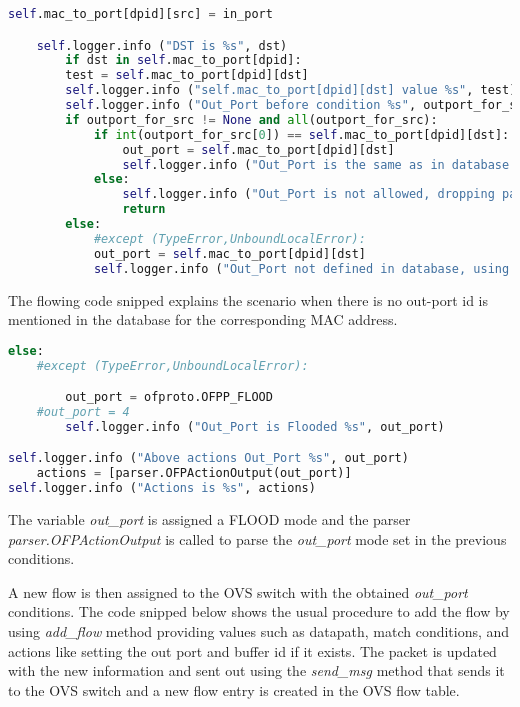 \begin{lstlisting}[language=Python]
	    self.mac_to_port[dpid][src] = in_port

	self.logger.info ("DST is %s", dst)
		if dst in self.mac_to_port[dpid]:
		test = self.mac_to_port[dpid][dst]
		self.logger.info ("self.mac_to_port[dpid][dst] value %s", test)
		self.logger.info ("Out_Port before condition %s", outport_for_src)
		if outport_for_src != None and all(outport_for_src):
			if int(outport_for_src[0]) == self.mac_to_port[dpid][dst]:
				out_port = self.mac_to_port[dpid][dst]
				self.logger.info ("Out_Port is the same as in database table %s", out_port)
			else:
				self.logger.info ("Out_Port is not allowed, dropping packet")	
				return	
		else:
			#except (TypeError,UnboundLocalError):		
			out_port = self.mac_to_port[dpid][dst]		
			self.logger.info ("Out_Port not defined in database, using learned port")	
\end{lstlisting}

The flowing code snipped explains the scenario when there is no out-port id is mentioned in the database for the corresponding MAC address. 

\begin{lstlisting}[language=Python]
	else:
	#except (TypeError,UnboundLocalError):

		out_port = ofproto.OFPP_FLOOD
	#out_port = 4
		self.logger.info ("Out_Port is Flooded %s", out_port)

self.logger.info ("Above actions Out_Port %s", out_port)
	actions = [parser.OFPActionOutput(out_port)]
self.logger.info ("Actions is %s", actions)
\end{lstlisting}

The variable \textit{out\_port} is assigned a FLOOD mode and the parser \textit{parser.OFPActionOutput} is called to parse the \textit{out\_port} mode set in the previous conditions. 

A new flow is then assigned to the OVS switch with the obtained \textit{out\_port} conditions. The code snipped below shows the usual procedure to add the flow by using \textit{add\_flow} method providing values such as datapath, match conditions, and actions like setting the out port and buffer id if it exists. The packet is updated with the new information and sent out using the \textit{send\_msg} method that sends it to the OVS switch and a new flow entry is created in the OVS flow table.

